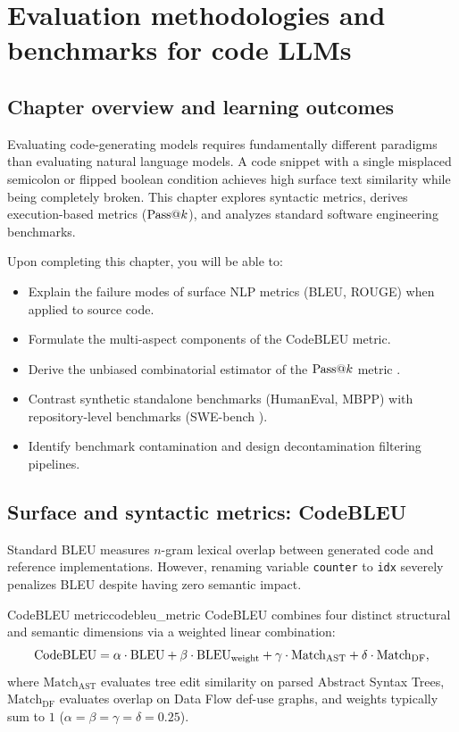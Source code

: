 \documentclass[../../main.tex]{subfiles}
\begin{document}
\chapter{Evaluation methodologies and benchmarks for code LLMs}
\label{ch:evaluation_metrics_benchmarks_se}

\section{Chapter overview and learning outcomes}
Evaluating code-generating models requires fundamentally different paradigms than evaluating natural language models. A code snippet with a single misplaced semicolon or flipped boolean condition achieves high surface text similarity while being completely broken. This chapter explores syntactic metrics, derives execution-based metrics ($\mathrm{Pass}@k$), and analyzes standard software engineering benchmarks.

Upon completing this chapter, you will be able to:
\begin{itemize}
    \item Explain the failure modes of surface NLP metrics (BLEU, ROUGE) when applied to source code.
    \item Formulate the multi-aspect components of the CodeBLEU metric.
    \item Derive the unbiased combinatorial estimator of the $\mathrm{Pass}@k$ metric \citep{chen2021codex}.
    \item Contrast synthetic standalone benchmarks (HumanEval, MBPP) with repository-level benchmarks (SWE-bench \citep{jimenez2024swebench}).
    \item Identify benchmark contamination and design decontamination filtering pipelines.
\end{itemize}

\section{Surface and syntactic metrics: CodeBLEU}
Standard BLEU measures $n$-gram lexical overlap between generated code and reference implementations. However, renaming variable \texttt{counter} to \texttt{idx} severely penalizes BLEU despite having zero semantic impact.

\begin{definition}{CodeBLEU metric}{codebleu_metric}
CodeBLEU combines four distinct structural and semantic dimensions via a weighted linear combination:
\begin{equation}
\label{eq:codebleu}
\mathrm{CodeBLEU} = \alpha \cdot \text{BLEU} + \beta \cdot \text{BLEU}_{\text{weight}} + \gamma \cdot \text{Match}_{\text{AST}} + \delta \cdot \text{Match}_{\text{DF}},
\end{equation}
where $\text{Match}_{\text{AST}}$ evaluates tree edit similarity on parsed Abstract Syntax Trees, $\text{Match}_{\text{DF}}$ evaluates overlap on Data Flow def-use graphs, and weights typically sum to $1$ ($\alpha = \beta = \gamma = \delta = 0.25$).
\end{definition}
\end{document}
